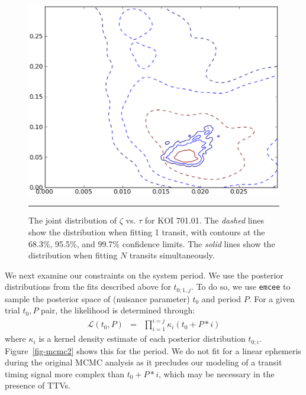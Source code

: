 \begin{figure}[t] 
  \begin{minipage}[c]{0.47\textwidth}
    \includegraphics[width=\textwidth]{figures/joint.eps}
  \end{minipage}\hfill
  \begin{minipage}[c]{0.5\textwidth}
    \caption{The joint distribution of $\zeta$ vs. $\tau$ for KOI
      701.01.  The {\it dashed} lines show the distribution when
      fitting 1 transit, with contours at the 68.3\%, 95.5\%, and
      99.7\% confidence limits.  The {\it solid} lines show the
      distribution when fitting $N$ transits simultaneously.}
    \label{fig-joint}
    \hspace*{\fill}  
    \hrule
  \end{minipage}
\end{figure}


We next examine our constraints on the system period.  We use the
posterior distributions from the fits described above for
$t_{0;1..j}$.  To do so, we use {\tt emcee} to sample the posterior
space of (nuisance parameter) $t_0$ and period $P$.  For a given trial
$t_0, P$ pair, the likelihood is determined through:
\begin{eqnarray}
\mathcal{L}(t_0, P) & = & \prod_{i=1}^{i=j} \kappa_i(t_0 + P * i)
\end{eqnarray}
where $\kappa_i$ is a kernel density estimate of each posterior
distribution $t_{0;i}$.  Figure~\ref{fig-mcmc2} shows this for the
period.  We do not fit for a linear ephemeris during the original MCMC
analysis as it precludes our modeling of a transit timing signal more
complex than $t_0 + P * i$, which may be necessary in the presence of
TTVs.

